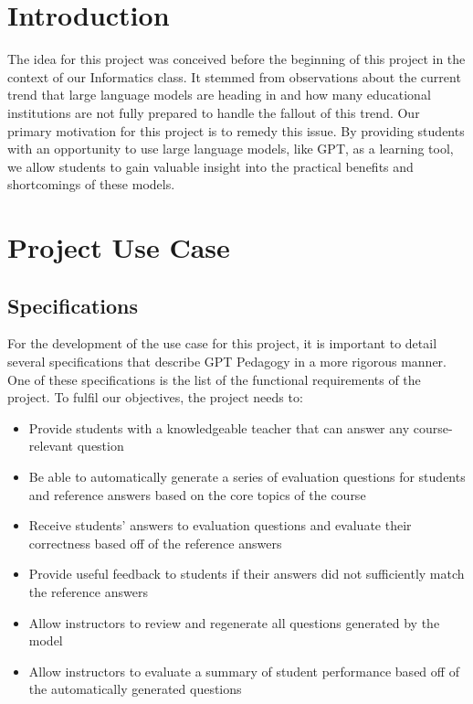\documentclass[12pt,a4paper]{article}
\begin{document}
    \pagebreak
    \section{Introduction}

    The idea for this project was conceived before the beginning of this project in the context of
    our Informatics class.  It stemmed from observations about the current trend that large language
    models are heading in and how many educational institutions are not fully prepared to handle the
    fallout of this trend.  Our primary motivation for this project is to remedy this issue.  By
    providing students with an opportunity to use large language models, like GPT, as a learning tool,
    we allow students to gain valuable insight into the practical benefits and shortcomings of these models.

    \section{Project Use Case}

    \subsection{Specifications}

    For the development of the use case for this project, it is important to detail several
    specifications that describe GPT Pedagogy in a more rigorous manner.  One of these specifications
    is the list of the functional requirements of the project.  To fulfil our objectives, the
    project needs to:

    \begin{itemize}
        \item Provide students with a knowledgeable teacher that can answer any course-relevant question
        \item Be able to automatically generate a series of evaluation questions for students and
        reference answers based on the core topics of the course
        \item Receive students' answers to evaluation questions and evaluate their correctness based
        off of the reference answers
        \item Provide useful feedback to students if their answers did not sufficiently match the
        reference answers
        \item Allow instructors to review and regenerate all questions generated by the model
        \item Allow instructors to evaluate a summary of student performance based off of the
        automatically generated questions
    \end{itemize}
\end{document}
